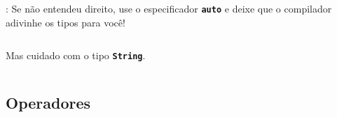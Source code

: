 \begin{frame}{\insertsection: \insertsubsection}
  Se não entendeu direito, use o especificador \textbf{\texttt{\textcolor{CustomOrange}{auto}}} e deixe que o compilador adivinhe os tipos para você!
  \inputminted[firstline=16,lastline=20]{arduino}{sketches/introLinguagem/.variaveis.ino}

  \pause
  Mas cuidado com o tipo \textbf{\texttt{\textcolor{CustomOrange}{String}}}.
  \inputminted[firstline=22,lastline=26]{arduino}{sketches/introLinguagem/.variaveis.ino}
\end{frame}


\subsection{Operadores}



